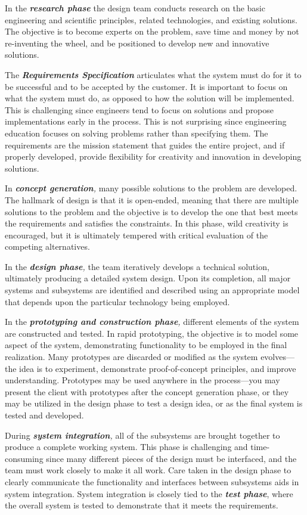 In the \emph{\textbf{research phase}} the design team conducts research
on the basic engineering and scientific principles, related
technologies, and existing solutions. The objective is to become experts
on the problem, save time and money by not re-inventing the wheel, and
be positioned to develop new and innovative solutions.

The \emph{\textbf{Requirements Specification}} articulates what the
system must do for it to be successful and to be accepted by the
customer. It is important to focus on what the system must do, as
opposed to how the solution will be implemented. This is challenging
since engineers tend to focus on solutions and propose implementations
early in the process. This is not surprising since engineering education
focuses on solving problems rather than specifying them. The
requirements are the mission statement that guides the entire project,
and if properly developed, provide flexibility for creativity and
innovation in developing solutions.

In \emph{\textbf{concept generation},} many possible solutions to the
problem are developed. The hallmark of design is that it is open-ended,
meaning that there are multiple solutions to the problem and the
objective is to develop the one that best meets the requirements and
satisfies the constraints. In this phase, wild creativity is encouraged,
but it is ultimately tempered with critical evaluation of the competing
alternatives.

In the \emph{\textbf{design phase},} the team iteratively develops a
technical solution, ultimately producing a detailed system design. Upon
its completion, all major systems and subsystems are identified and
described using an appropriate model that depends upon the particular
technology being employed.

In the \emph{\textbf{prototyping and construction phase},} different
elements of the system are constructed and tested. In rapid prototyping,
the objective is to model some aspect of the system, demonstrating
functionality to be employed in the final realization. Many prototypes
are discarded or modified as the system evolves---the idea is to
experiment, demonstrate proof-of-concept principles, and improve
understanding. Prototypes may be used anywhere in the process---you may
present the client with prototypes after the concept generation phase,
or they may be utilized in the design phase to test a design idea, or as
the final system is tested and developed.

During \emph{\textbf{system integration},} all of the subsystems are
brought together to produce a complete working system. This phase is
challenging and time-consuming since many different pieces of the design
must be interfaced, and the team must work closely to make it all work.
Care taken in the design phase to clearly communicate the functionality
and interfaces between subsystems aids in system integration. System
integration is closely tied to the \emph{\textbf{test phase}}, where the
overall system is tested to demonstrate that it meets the requirements.

